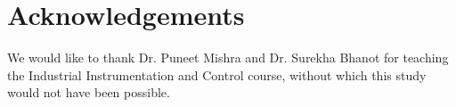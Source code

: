 \section{Acknowledgements}

We would like to thank Dr. Puneet Mishra and Dr. Surekha Bhanot for teaching the Industrial Instrumentation and Control course, without which this study would not have been possible.